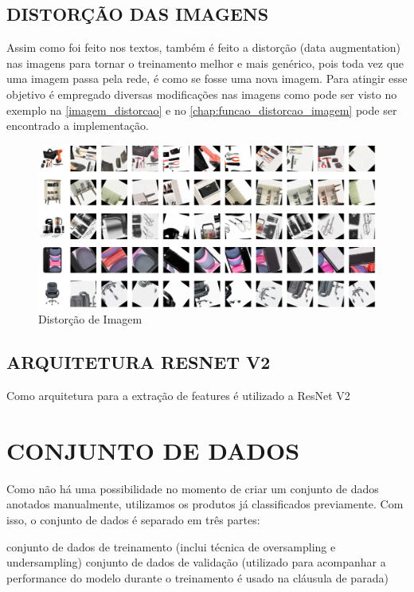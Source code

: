 \subsection{DISTORÇÃO DAS IMAGENS}

Assim como foi feito nos textos, também é feito a distorção (data augmentation) nas imagens para tornar o treinamento melhor e mais genérico, pois toda vez que uma imagem passa pela rede, é como se fosse uma nova imagem. Para atingir esse objetivo é empregado diversas modificações nas imagens como pode ser visto no exemplo na \autoref{imagem_distorcao} e no \autoref{chap:funcao_distorcao_imagem} pode ser encontrado a implementação.

\begin{figure}[htb]
	\caption{\label{imagem_distorcao} Distorção de Imagem}
	\begin{center}
	    \includegraphics[width=\textwidth]{artigo/recursos/imagens/imagem_distorcao.png}
	\end{center}
\end{figure}

\subsection{ARQUITETURA RESNET V2}

Como arquitetura para a extração de features é utilizado a ResNet V2 

\section{CONJUNTO DE DADOS}
Como não há uma possibilidade no momento de criar um conjunto de dados anotados manualmente, utilizamos os produtos já classificados previamente.     Com isso, o conjunto de dados é separado em três partes:

conjunto de dados de treinamento (inclui técnica de oversampling e undersampling)
conjunto de dados de validação (utilizado para acompanhar a performance do modelo durante o treinamento é usado na cláusula de parada)


